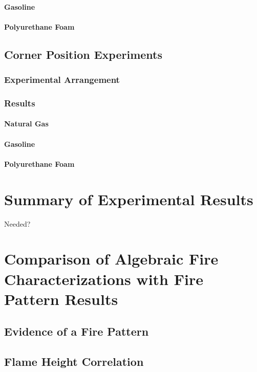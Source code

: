 \documentclass[twoside]{uocthesis}
\begin{document}
{{\subsubsection{Gasoline}
\subsubsection{Polyurethane Foam}

\section{Corner Position Experiments}

\subsection{Experimental Arrangement}

\subsection{Results}

\subsubsection{Natural Gas}
\subsubsection{Gasoline}
\subsubsection{Polyurethane Foam}

\chapter{Summary of Experimental Results}

Needed?

\chapter{Comparison of Algebraic Fire Characterizations with Fire Pattern Results}

\section{Evidence of a Fire Pattern}

\section{Flame Height Correlation}

}}
\end{document}
